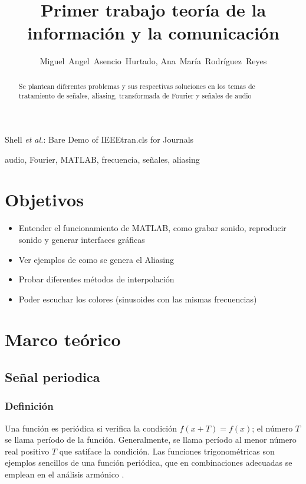 \documentclass[comsoc, journal]{IEEEtran}
\begin{document}
\title{Primer trabajo teoría de la información y la comunicación}
\author{Miguel~Angel~Asencio~Hurtado, Ana~María~Rodríguez~Reyes%
}

%
{Shell \MakeLowercase{\textit{et al.}}: Bare Demo of IEEEtran.cls for Journals}

\maketitle


\begin{abstract}
Se plantean diferentes problemas y sus respectivas soluciones en los temas de tratamiento de señales, aliasing, transformada de Fourier y señales de audio
\end{abstract}

\begin{IEEEkeywords}
audio, Fourier, MATLAB, frecuencia, señales, aliasing
\end{IEEEkeywords}

\IEEEpeerreviewmaketitle

\section{Objetivos}

\begin{itemize}
    \item Entender el funcionamiento de MATLAB, como grabar sonido, reproducir sonido y generar interfaces gráficas
    \item Ver ejemplos de como se genera el Aliasing
    \item Probar diferentes métodos de interpolación
    \item Poder escuchar los colores (sinusoides con las mismas frecuencias)
\end{itemize}

\section{Marco teórico}
\subsection{Señal periodica}
\subsubsection{Definición}
Una función es periódica si verifica la condición $f(x + T) = f(x)$; el número  $T$  se llama período de la función. Generalmente, se llama período al menor número real positivo $T$ que satiface la condición. Las funciones trigonométricas son ejemplos sencillos de una función periódica, que en combinaciones adecuadas se emplean en el análisis armónico \cite{encyc}.
\end{document}
